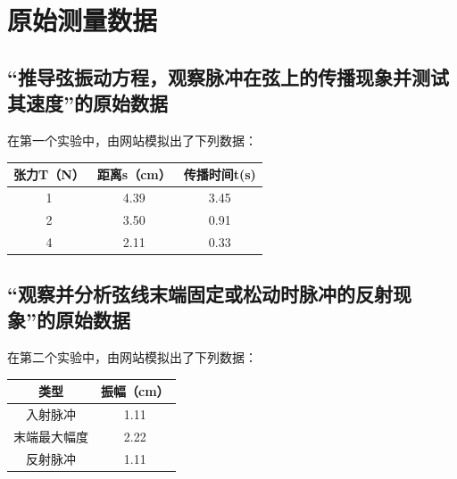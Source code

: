 \documentclass[UTF8]{ctexart}
\begin{document}
\section{原始测量数据}
\subsection{“推导弦振动方程，观察脉冲在弦上的传播现象并测试其速度”的原始数据}
在第一个实验中，由网站模拟出了下列数据：
\begin{table}[htbp!] 
\centering 
\begin{tabular}{|c|c|c|} 
\hline 
 张力T（N）&距离s（cm） &  传播时间t(s) \\ 
\hline 
 1&4.39&3.45  \\ 
\hline 
 2&3.50 &0.91\\ 
\hline 
 4&2.11&0.33 \\ 
\hline
\end{tabular} 
\end{table}
\subsection{“观察并分析弦线末端固定或松动时脉冲的反射现象”的原始数据}
在第二个实验中，由网站模拟出了下列数据：
\begin{table}[htbp!] 
\centering 
\begin{tabular}{|c|c|} 
\hline 
类型 & 振幅（cm）  \\ 
\hline 
入射脉冲 & 1.11 \\ 
\hline
末端最大幅度 &2.22\\ 
\hline 
反射脉冲& 1.11  \\  
\hline
\end{tabular} 
\end{table}
\end{document}
